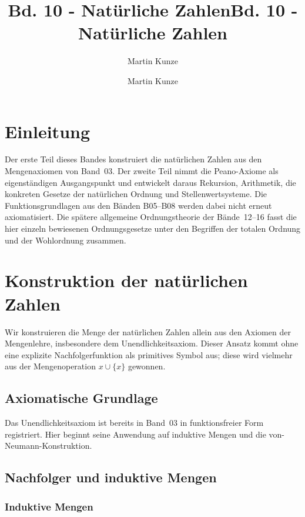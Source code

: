 \documentclass[main.tex]{subfiles}
\title{Bd. 10 - Natürliche Zahlen}
\author{Martin Kunze}
\date{}
\begin{document}
\title{Bd. 10 - Natürliche Zahlen}
\author{Martin Kunze}
\date{}
\hypersetup{pageanchor=false}
\maketitle
\hypersetup{pageanchor=true}
\setcounter{tocdepth}{3}
\tableofcontents
\setcounter{file}{10}
\renewcommand{\FormulaBandID}{10}

\chapter{Einleitung}

Der erste Teil dieses Bandes konstruiert die natürlichen Zahlen aus den
Mengenaxiomen von Band~03. Der zweite Teil nimmt die Peano-Axiome als
eigenständigen Ausgangspunkt und entwickelt daraus Rekursion, Arithmetik,
die konkreten Gesetze der natürlichen Ordnung und Stellenwertsysteme. Die
Funktionsgrundlagen aus den Bänden B05--B08 werden dabei nicht erneut
axiomatisiert. Die spätere allgemeine Ordnungstheorie der Bände~12--16 fasst die hier einzeln
bewiesenen Ordnungsgesetze unter den Begriffen der totalen Ordnung und der
Wohlordnung zusammen.

\chapter{Konstruktion der natürlichen Zahlen}

Wir konstruieren die Menge der natürlichen Zahlen allein aus den Axiomen der Mengenlehre, insbesondere dem Unendlichkeitsaxiom.  Dieser Ansatz kommt ohne eine explizite Nachfolgerfunktion als primitives Symbol aus; diese wird vielmehr aus der Mengenoperation \(x \cup \{x\}\) gewonnen.


\section{Axiomatische Grundlage}

Das Unendlichkeitsaxiom ist bereits in Band~03 in funktionsfreier Form
registriert. Hier beginnt seine Anwendung auf induktive Mengen und die
von-Neumann-Konstruktion.

\section{Nachfolger und induktive Mengen}

\subsection{Induktive Mengen}
\end{document}
